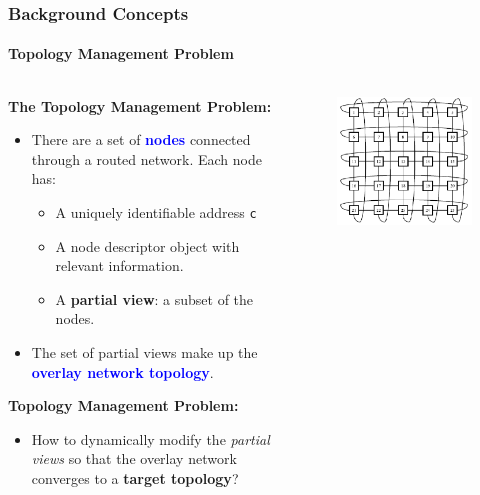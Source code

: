 \documentclass[10pt,    %
    english,            %
    xcolor=table,       %
    envcountsect,        %
    aspectratio=169     %
]{beamer}
\begin{document}
\begin{frame}
    \frametitle{Background Concepts}
    \framesubtitle{Topology Management Problem}

    \vspace{-20pt}
    \begin{columns}
        \begin{column}{.65\textwidth}
            \textbf{The Topology Management Problem:}
            \begin{itemize}
                \item There are a set of \textcolor{blue}{\textbf{nodes}} connected through a routed network. Each node has:
                \begin{itemize}
                    \item A uniquely identifiable address \texttt{c}
                    \item A node descriptor object with relevant information.
                    \item A \textbf{partial view}: a subset of the nodes.
                \end{itemize}
                \item The set of partial views make up the \textcolor{blue}{\textbf{overlay network topology}}.
            \end{itemize}
            \textbf{Topology Management Problem:}
            \begin{itemize}
                \item How to dynamically modify the \textit{partial views} so that the overlay network converges to a \textbf{target topology}?
            \end{itemize}
        \end{column}
        \hfill
        \begin{column}{.35\textwidth}
            \begin{figure}[h!]
                \centering
                \includegraphics[width=.6\textwidth]{./images/torus-network-topology.png}

\end{figure}
\end{column}
\end{columns}
\end{frame}
\end{document}
